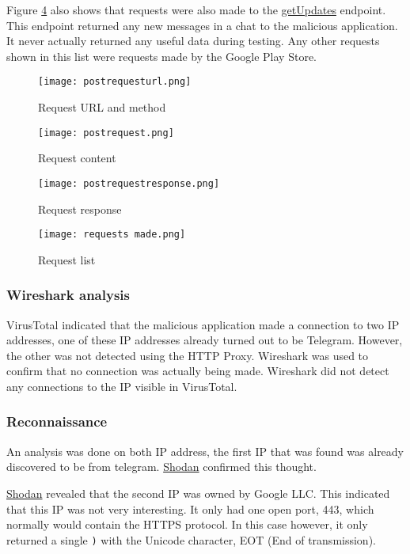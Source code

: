 Figure \ref{rafael-requestlist} also shows that requests were also made to the \href{https://core.telegram.org/bots/api#getupdates}{getUpdates} endpoint.
This endpoint returned any new messages in a chat to the malicious application.
It never actually returned any useful data during testing.
Any other requests shown in this list were requests made by the Google Play Store.

\begin{figure}[H]
    \texttt{[image: postrequesturl.png]}
    \caption{Request URL and method}
    \label{rafael-requesturl}
\end{figure}
\begin{figure}[H]
    \texttt{[image: postrequest.png]}
    \caption{Request content}
    \label{rafael-requestcontent}
\end{figure}
\begin{figure}[H]
    \texttt{[image: postrequestresponse.png]}
    \caption{Request response}
    \label{rafael-requestresponse}
\end{figure}
\begin{figure}[H]
    \texttt{[image: requests made.png]}
    \caption{Request list}
    \label{rafael-requestlist}
\end{figure}

\subsubsection{Wireshark analysis}

VirusTotal indicated that the malicious application made a connection to two IP addresses, one of these IP addresses already turned out to be Telegram.
However, the other was not detected using the HTTP Proxy.
Wireshark was used to confirm that no connection was actually being made. Wireshark did not detect any connections to the IP visible in VirusTotal.

\subsubsection{Reconnaissance}

An analysis was done on both IP address, the first IP that was found was already discovered to be from telegram.
\href{https://www.shodan.io/host/149.154.167.220}{Shodan} confirmed this thought.

\href{https://www.shodan.io/host/142.250.31.188}{Shodan} revealed that the second IP was owned by Google LLC. This indicated that this IP was not very interesting.
It only had one open port, 443, which normally would contain the HTTPS protocol.
In this case however, it only returned a single \texttt{)} with the Unicode character, EOT (End of transmission).
